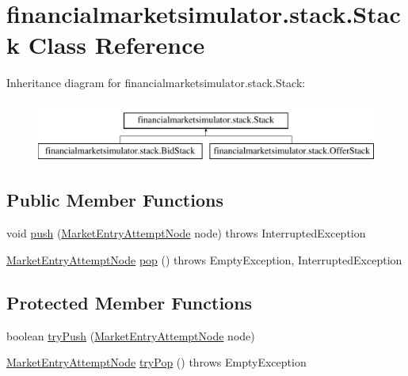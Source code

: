 \hypertarget{classfinancialmarketsimulator_1_1stack_1_1_stack}{\section{financialmarketsimulator.\+stack.\+Stack Class Reference}
\label{classfinancialmarketsimulator_1_1stack_1_1_stack}
}
Inheritance diagram for financialmarketsimulator.\+stack.\+Stack\+:\begin{figure}[H]
\begin{center}
\leavevmode
\includegraphics[height=2.000000cm]{classfinancialmarketsimulator_1_1stack_1_1_stack}
\end{center}
\end{figure}
\subsection*{Public Member Functions}
\begin{DoxyCompactItemize}
\item 
void \hyperlink{classfinancialmarketsimulator_1_1stack_1_1_stack_a923eeb3696e2bbb208516defd3039213}{push} (\hyperlink{classfinancialmarketsimulator_1_1stack_1_1_market_entry_attempt_node}{Market\+Entry\+Attempt\+Node} node)  throws Interrupted\+Exception 
\item 
\hyperlink{classfinancialmarketsimulator_1_1stack_1_1_market_entry_attempt_node}{Market\+Entry\+Attempt\+Node} \hyperlink{classfinancialmarketsimulator_1_1stack_1_1_stack_acf0de0447fa83242a8409bc5903ca215}{pop} ()  throws Empty\+Exception, Interrupted\+Exception 
\end{DoxyCompactItemize}
\subsection*{Protected Member Functions}
\begin{DoxyCompactItemize}
\item 
boolean \hyperlink{classfinancialmarketsimulator_1_1stack_1_1_stack_a2566c4821f0d3091cdac87b5ee7404bf}{try\+Push} (\hyperlink{classfinancialmarketsimulator_1_1stack_1_1_market_entry_attempt_node}{Market\+Entry\+Attempt\+Node} node)
\item 
\hyperlink{classfinancialmarketsimulator_1_1stack_1_1_market_entry_attempt_node}{Market\+Entry\+Attempt\+Node} \hyperlink{classfinancialmarketsimulator_1_1stack_1_1_stack_aacd57a41238742e12b8ee9f20b93b162}{try\+Pop} ()  throws Empty\+Exception 
\end{DoxyCompactItemize}


